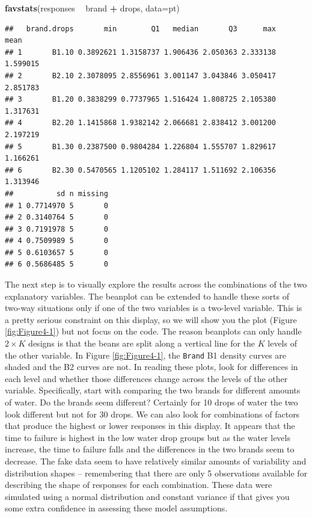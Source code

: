 \documentclass[]{book}
\newenvironment{Shaded}{\begin{snugshade}}{\end{snugshade}}
\newcommand{\KeywordTok}[1]{\textcolor[rgb]{0.13,0.29,0.53}{\textbf{#1}}}
\newcommand{\DataTypeTok}[1]{\textcolor[rgb]{0.13,0.29,0.53}{#1}}
\newcommand{\StringTok}[1]{\textcolor[rgb]{0.31,0.60,0.02}{#1}}
\newcommand{\OperatorTok}[1]{\textcolor[rgb]{0.81,0.36,0.00}{\textbf{#1}}}
\newcommand{\NormalTok}[1]{#1}
\theoremstyle{definition}
\theoremstyle{definition}
\theoremstyle{remark}
\begin{document}
\begin{Shaded}
\begin{Highlighting}[]
\KeywordTok{favstats}\NormalTok{(responses }\OperatorTok{~}\StringTok{ }\NormalTok{brand }\OperatorTok{+}\StringTok{ }\NormalTok{drops, }\DataTypeTok{data=}\NormalTok{pt)}
\end{Highlighting}
\end{Shaded}

\begin{verbatim}
##   brand.drops       min        Q1   median       Q3      max     mean
## 1       B1.10 0.3892621 1.3158737 1.906436 2.050363 2.333138 1.599015
## 2       B2.10 2.3078095 2.8556961 3.001147 3.043846 3.050417 2.851783
## 3       B1.20 0.3838299 0.7737965 1.516424 1.808725 2.105380 1.317631
## 4       B2.20 1.1415868 1.9382142 2.066681 2.838412 3.001200 2.197219
## 5       B1.30 0.2387500 0.9804284 1.226804 1.555707 1.829617 1.166261
## 6       B2.30 0.5470565 1.1205102 1.284117 1.511692 2.106356 1.313946
##          sd n missing
## 1 0.7714970 5       0
## 2 0.3140764 5       0
## 3 0.7191978 5       0
## 4 0.7509989 5       0
## 5 0.6103657 5       0
## 6 0.5686485 5       0
\end{verbatim}

The next step is to visually explore the results across the combinations
of the two explanatory variables. The beanplot can be extended to handle
these sorts of two-way situations only if one of the two variables is a
two-level variable. This is a pretty serious constraint on this display,
so we will show you the plot (Figure \ref{fig:Figure4-1}) but not focus
on the code. The reason beanplots can only handle \(2 \times K\) designs
is that the beans are split along a vertical line for the \(K\) levels
of the other variable. In Figure \ref{fig:Figure4-1}, the \texttt{Brand}
B1 density curves are shaded and the B2 curves are not. In reading these
plots, look for differences in each level and whether those differences
change across the levels of the other variable. Specifically, start with
comparing the two brands for different amounts of water. Do the brands
seem different? Certainly for 10 drops of water the two look different
but not for 30 drops. We can also look for combinations of factors that
produce the highest or lower responses in this display. It appears that
the time to failure is highest in the low water drop groups but as the
water levels increase, the time to failure falls and the differences in
the two brands seem to decrease. The fake data seem to have relatively
similar amounts of variability and distribution shapes -- remembering
that there are only 5 observations available for describing the shape of
responses for each combination. These data were simulated using a normal
distribution and constant variance if that gives you some extra
confidence in assessing these model assumptions.
\end{document}
